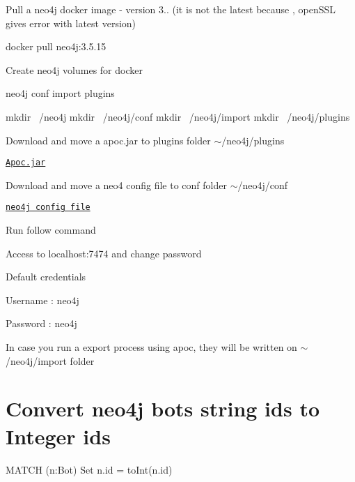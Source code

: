 
\begin{DoxyEnumerate}
\item Pull a neo4j docker image -\/ version 3.. (it is not the latest because , open\+S\+SL gives error with latest version) 
\begin{DoxyCode}
docker pull neo4j:3.5.15
\end{DoxyCode}

\item Create neo4j volumes for docker 
\begin{DoxyCode}
neo4j
    conf
    import
    plugins

mkdir ~/neo4j
mkdir ~/neo4j/conf
mkdir ~/neo4j/import
mkdir ~/neo4j/plugins
\end{DoxyCode}

\item Download and move a apoc.\+jar to plugins folder $\sim$/neo4j/plugins
\end{DoxyEnumerate}
\begin{DoxyItemize}
\item \href{https://github.com/neo4j-contrib/neo4j-apoc-procedures/releases/tag/3.5.0.9}{\tt Apoc.\+jar}
\end{DoxyItemize}
\begin{DoxyEnumerate}
\item Download and move a neo4 config file to conf folder $\sim$/neo4j/conf
\end{DoxyEnumerate}
\begin{DoxyItemize}
\item \href{http://s000.tinyupload.com/index.php?file_id=06009987256241638153}{\tt neo4j config file}
\end{DoxyItemize}
\begin{DoxyEnumerate}
\item Run follow command 

\item Access to localhost\+:7474 and change password
\end{DoxyEnumerate}
\begin{DoxyItemize}
\item Default credentials
\begin{DoxyItemize}
\item Username \+: neo4j
\item Password \+: neo4j
\end{DoxyItemize}
\end{DoxyItemize}
\begin{DoxyEnumerate}
\item In case you run a export process using apoc, they will be written on $\sim$/neo4j/import folder
\end{DoxyEnumerate}

\section*{Convert neo4j bots string ids to Integer ids}


\begin{DoxyCode}
MATCH (n:Bot) Set n.id = toInt(n.id)
\end{DoxyCode}
 